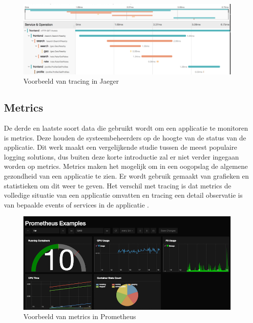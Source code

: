 \begin{figure}[ht]
    \includegraphics[scale=0.4]{img/tracing_voorbeeld}
    \caption[Voorbeeld van tracing in Jaeger]{Voorbeeld van tracing in Jaeger \cite{harlow2015}}
\end{figure}

\subsection{Metrics}

De derde en laatste soort data die gebruikt wordt om een applicatie te monitoren is metrics. Deze houden de systeembeheerders op de hoogte van de status van de applicatie. Dit werk maakt een vergelijkende studie tussen de meest populaire logging solutions, dus buiten deze korte introductie zal er niet verder ingegaan worden op metrics. Metrics maken het mogelijk om in een oogopslag de algemene gezondheid van een applicatie te zien. Er wordt gebruik gemaakt van grafieken en statistieken om dit weer te geven. Het verschil met tracing is dat metrics de volledige situatie van een applicatie omvatten en tracing een detail observatie is van bepaalde events of services in de applicatie \autocite{reichert2018}.
\\
\begin{figure}[ht]
    \centering
    \includegraphics[scale=0.8]{img/prometheus_example}
    \caption[Voorbeeld van metrics in Prometheus]{Voorbeeld van metrics in Prometheus \cite{christner2015}}
\end{figure}

